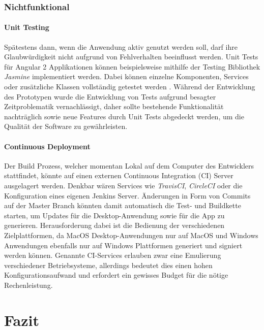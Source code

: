 \subsection{Nichtfunktional}


\subsubsection{Unit Testing}

Spätestens dann, wenn die Anwendung aktiv genutzt werden soll, darf ihre Glaubwürdigkeit nicht aufgrund von Fehlverhalten beeinflusst werden.
Unit Tests für Angular 2 Applikationen können beispielsweise mithilfe der Testing Bibliothek \emph{Jasmine} implementiert werden.
Dabei können einzelne Komponenten, Services oder zusätzliche Klassen vollständig getestet werden \cite{Angul78:online}.
Während der Entwicklung des Prototypen \projectname{} wurde die Entwicklung von Tests aufgrund besagter Zeitproblematik vernachlässigt,
daher sollte bestehende Funktionalität nachträglich sowie neue Features durch Unit Tests abgedeckt werden, um die Qualität der Software zu gewährleisten.

\subsubsection{Continuous Deployment}

Der Build Prozess, welcher momentan Lokal auf dem Computer des Entwicklers stattfindet, könnte auf einen externen Continuous Integration (CI) Server ausgelagert werden.
Denkbar wären Services wie \emph{TravisCI}, \emph{CircleCI} oder die Konfiguration eines eigenen Jenkins Server.
Änderungen in Form von Commits auf der Master Branch könnten damit automatisch die Test- und Buildkette starten, um Updates für die Desktop-Anwendung sowie für die App zu generieren.
Herausforderung dabei ist die Bedienung der verschiedenen Zielplattformen, da MacOS Desktop-Anwendungen nur auf MacOS und
Windows Anwendungen ebenfalls nur auf Windows Plattformen generiert und signiert werden können.
Genannte CI-Services erlauben zwar eine Emulierung verschiedener Betriebsysteme,
allerdings bedeutet dies einen hohen Konfigurationsaufwand und erfordert ein gewisses Budget für die nötige Rechenleistung.


\chapter{Fazit}

